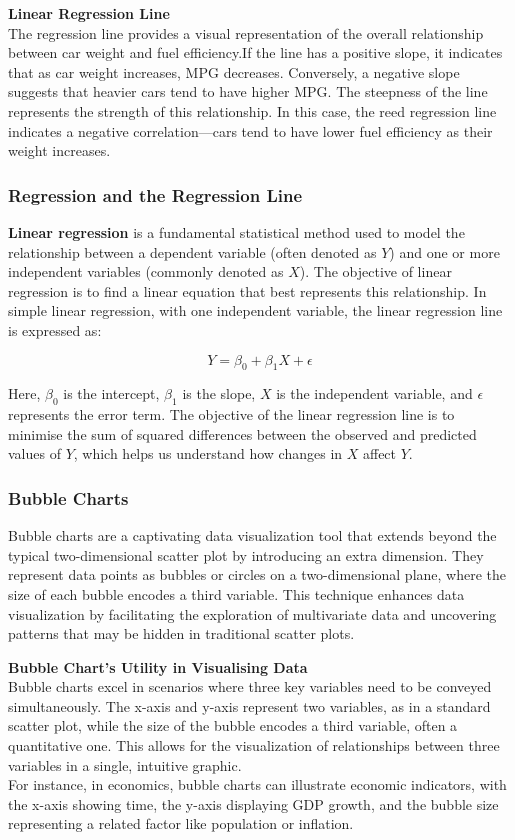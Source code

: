 \documentclass{article}\usepackage[]{graphicx}\usepackage[]{xcolor}
\begin{document}
\textbf{Linear Regression Line}\\
The regression line provides a visual representation of the overall relationship between car weight and fuel efficiency.If the line has a positive slope, it indicates that as car weight increases, MPG decreases. Conversely, a negative slope suggests that heavier cars tend to have higher MPG. The steepness of the line represents the strength of this relationship. In this case, the reed regression line indicates a negative correlation—cars tend to have lower fuel efficiency as their weight increases.

\subsubsection{Regression and the Regression Line}
\textbf{Linear regression} is a fundamental statistical method used to model the relationship between a dependent variable (often denoted as \(Y\)) and one or more independent variables (commonly denoted as \(X\)). The objective of linear regression is to find a linear equation that best represents this relationship. In simple linear regression, with one independent variable, the linear regression line is expressed as:

\[
Y = \beta_0 + \beta_1X + \epsilon
\]

Here, \(\beta_0\) is the intercept, \(\beta_1\) is the slope, \(X\) is the independent variable, and \(\epsilon\) represents the error term. The objective of the linear regression line is to minimise the sum of squared differences between the observed and predicted values of \(Y\), which helps us understand how changes in \(X\) affect \(Y\). 

\subsubsection{Bubble Charts}
Bubble charts are a captivating data visualization tool that extends beyond the typical two-dimensional scatter plot by introducing an extra dimension. They represent data points as bubbles or circles on a two-dimensional plane, where the size of each bubble encodes a third variable. This technique enhances data visualization by facilitating the exploration of multivariate data and uncovering patterns that may be hidden in traditional scatter plots.

\textbf{Bubble Chart's Utility in Visualising Data}\\
Bubble charts excel in scenarios where three key variables need to be conveyed simultaneously. The x-axis and y-axis represent two variables, as in a standard scatter plot, while the size of the bubble encodes a third variable, often a quantitative one. This allows for the visualization of relationships between three variables in a single, intuitive graphic.\\
For instance, in economics, bubble charts can illustrate economic indicators, with the x-axis showing time, the y-axis displaying GDP growth, and the bubble size representing a related factor like population or inflation. \\
\end{document}
